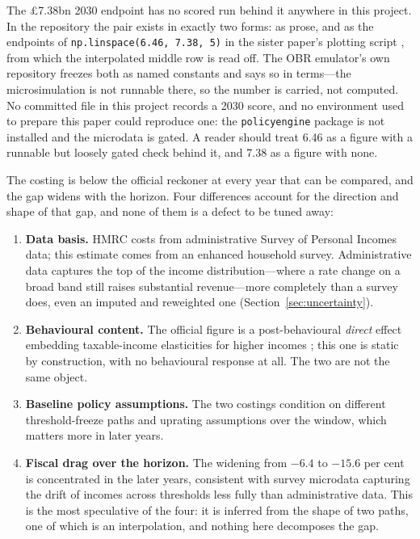 The \pounds 7.38bn 2030 endpoint has no scored run behind it anywhere in this project. In the repository the pair exists in exactly two forms: as prose, and as the endpoints of \texttt{np.linspace(6.46, 7.38, 5)} in the sister paper's plotting script \citep{ahmadi2026obr}, from which the interpolated middle row is read off. The OBR emulator's own repository freezes both as named constants and says so in terms---the microsimulation is not runnable there, so the number is carried, not computed. No committed file in this project records a 2030 score, and no environment used to prepare this paper could reproduce one: the \texttt{policyengine} package is not installed and the microdata is gated. A reader should treat 6.46 as a figure with a runnable but loosely gated check behind it, and 7.38 as a figure with none.

The costing is below the official reckoner at every year that can be compared, and the gap widens with the horizon. Four differences account for the direction and shape of that gap, and none of them is a defect to be tuned away:

\begin{enumerate}
\item \textbf{Data basis.} HMRC costs from administrative Survey of Personal Incomes data; this estimate comes from an enhanced household survey. Administrative data captures the top of the income distribution---where a rate change on a broad band still raises substantial revenue---more completely than a survey does, even an imputed and reweighted one (Section~\ref{sec:uncertainty}).
\item \textbf{Behavioural content.} The official figure is a post-behavioural \emph{direct} effect embedding taxable-income elasticities for higher incomes \citep{saez2012}; this one is static by construction, with no behavioural response at all. The two are not the same object.
\item \textbf{Baseline policy assumptions.} The two costings condition on different threshold-freeze paths and uprating assumptions over the window, which matters more in later years.
\item \textbf{Fiscal drag over the horizon.} The widening from $-6.4$ to $-15.6$ per cent is concentrated in the later years, consistent with survey microdata capturing the drift of incomes across thresholds less fully than administrative data. This is the most speculative of the four: it is inferred from the shape of two paths, one of which is an interpolation, and nothing here decomposes the gap.
\end{enumerate}

